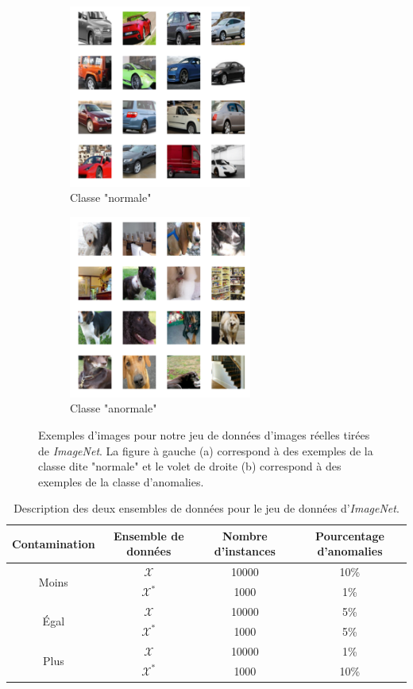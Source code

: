 \begin{figure}[htb]
	\centering
	\begin{subfigure}{6cm}
		\centering\includegraphics[width=6cm]{images/imagenet-inliers}
		\caption{Classe "normale"}
	\end{subfigure}
	\begin{subfigure}{6cm}
		\centering\includegraphics[width=6cm]{images/imagenet-outliers}
		\caption{Classe "anormale"}
	\end{subfigure}
	\caption[Exemples d'images pour notre jeu de données d'images réelles tirées de \textit{ImageNet}.]{Exemples d'images pour notre jeu de données d'images réelles tirées de \textit{ImageNet}. La figure à gauche (a) correspond à des exemples de la classe dite "normale" et le volet de droite (b) correspond à des exemples de la classe d'anomalies.}
	\label{fig:imagenet}
\end{figure}

\begin{table}[h]
	\centering
	\caption{Description des deux ensembles de données pour le jeu de données d'\textit{ImageNet}.}
	\begin{tabular}{| c | c | c | c |}
		\hline
		\rowcolor{Gray}
		Contamination & Ensemble de données  & Nombre d'instances & Pourcentage d'anomalies  \\
		\hline
		\multirow{2}{*}{Moins} 
		& $\mathcal{X}$ & 10000 & 10\%  \\
		& $\mathcal{X^*}$  & 1000 & 1\%  \\ 
		\midrule
		\multirow{2}{*}{Égal} 
		& $\mathcal{X}$ & 10000 & 5\%  \\
		& $\mathcal{X^*}$  & 1000 & 5\%  \\ 
		\midrule
		\multirow{2}{*}{Plus} 
		& $\mathcal{X}$ & 10000 & 1\%  \\
		& $\mathcal{X^*}$  & 1000 & 10\%  \\ 
		\midrule
	\end{tabular}
	\label{tab:dataset1}
\end{table}

